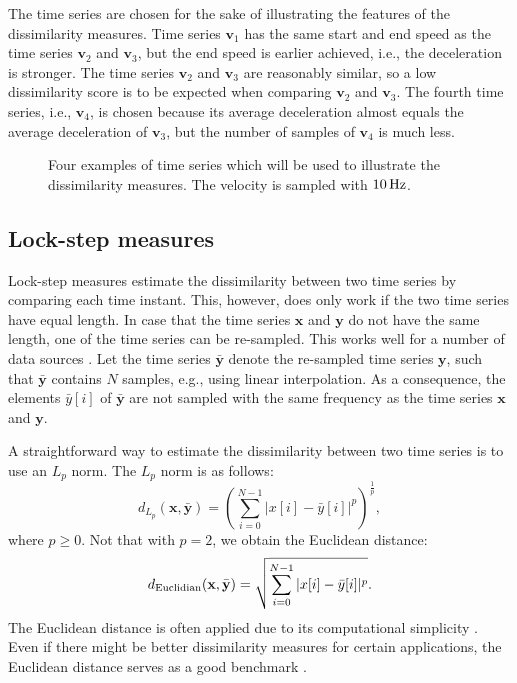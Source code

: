 \documentclass[10pt,final,a4paper,oneside,onecolumn]{article}
\newlength\figurewidth
\newlength\figureheight
\newcommand{\deuclid}{d_{\textup{Euclidian}}}
\newcommand{\profile}[1]{\textbf{v}_{#1}}
\theoremstyle{plain}\newtheorem{definition}{Definition}[section]    %
\theoremstyle{definition}\newtheorem{example}{Example}[section]     %
\theoremstyle{remark}\newtheorem{remarkenv}{Remark}[section]        %
\begin{document}
The time series are chosen for the sake of illustrating the features of the dissimilarity measures. Time series $\profile{1}$ has the same start and end speed as the time series $\profile{2}$ and $\profile{3}$, but the end speed is earlier achieved, i.e., the deceleration is stronger. The time series $\profile{2}$ and $\profile{3}$ are reasonably similar, so a low dissimilarity score is to be expected when comparing $\profile{2}$ and $\profile{3}$. The fourth time series, i.e., $\profile{4}$, is chosen because its average deceleration almost equals the average deceleration of $\profile{3}$, but the number of samples of $\profile{4}$ is much less.

\begin{figure}
	\centering
	\setlength{}
	\setlength{}
	
	\caption{Four examples of time series which will be used to illustrate the dissimilarity measures. The velocity is sampled with $\unit[10]{Hz}$.}
	\label{fig:example time series}
\end{figure}

\subsection{Lock-step measures}
\label{sec:lock step}

Lock-step measures estimate the dissimilarity between two time series by comparing each time instant. This, however, does only work if the two time series have equal length. In case that the time series $\textbf{x}$ and $\textbf{y}$ do not have the same length, one of the time series can be re-sampled. This works well for a number of data sources \cite{keogh2003survey}. Let the time series $\bar{\textbf{y}}$ denote the re-sampled time series $\textbf{y}$, such that $\bar{\textbf{y}}$ contains $N$ samples, e.g., using linear interpolation. As a consequence, the elements $\bar{y}[i]$ of $\bar{\textbf{y}}$ are not sampled with the same frequency as the time series $\textbf{x}$ and $\textbf{y}$. 

A straightforward way to estimate the dissimilarity between two time series is to use an $L_p$ norm. The $L_p$ norm is as follows:
\begin{equation} \label{eq:lp norm}
	d_{L_p}(\textbf{x}, \bar{\textbf{y}}) = \left( \sum_{i=0}^{N-1} |x[i] - \bar{y}[i]|^p \right)^{\frac{1}{p}},
\end{equation}
where $p \geq 0$. Not that with $p=2$, we obtain the Euclidean distance:
\begin{equation} \label{eq:euclidian}
	\deuclid(\textbf{x}, \bar{\textbf{y}}) = \sqrt{\sum_{i=0}^{N-1} |x[i] - \bar{y}[i]|^p}.
\end{equation}
The Euclidean distance is often applied due to its computational simplicity \cite{xing2010survey}. Even if there might be better dissimilarity measures for certain applications, the Euclidean distance serves as a good benchmark \cite{keogh2003survey}.
\end{document}
